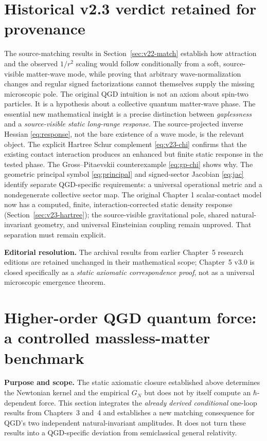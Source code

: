 \documentclass[11pt,a4paper]{article}
\theoremstyle{remark}\newtheorem{remark}[theorem]{Remark}
\begin{document}
\section{Historical v2.3 verdict retained for provenance}
The source-matching results in Section~\ref{sec:v22-match} establish how attraction and the observed $1/r^2$ scaling would follow conditionally from a soft, source-visible matter-wave mode, while proving that arbitrary wave-normalization changes and regular signed factorizations cannot themselves supply the missing microscopic pole. The original QGD intuition is not an axiom about spin-two particles. It is a hypothesis about a collective quantum matter-wave phase. The essential new mathematical insight is a precise distinction between \emph{gaplessness} and a \emph{source-visible static long-range response}. The source-projected inverse Hessian \eqref{eq:response}, not the bare existence of a wave mode, is the relevant object. The explicit Hartree Schur complement \eqref{eq:v23-chi} confirms that the existing contact interaction produces an enhanced but finite static response in the tested phase. The Gross--Pitaevskii counterexample \eqref{eq:gp-chi} shows why. The geometric principal symbol \eqref{eq:principal} and signed-sector Jacobian \eqref{eq:jac} identify separate QGD-specific requirements: a universal operational metric and a nondegenerate collective sector map. The original Chapter 1 scalar-contact model now has a computed, finite, interaction-corrected static density response (Section~\ref{sec:v23-hartree}); the source-visible gravitational pole, shared natural-invariant geometry, and universal Einsteinian coupling remain unproved. That separation must remain explicit.

\noindent\textbf{Editorial resolution.} The archival results from earlier Chapter~5 research editions are retained unchanged in their mathematical scope; Chapter~5 v3.0 is closed specifically as a \emph{static axiomatic correspondence proof}, not as a universal microscopic emergence theorem.\\[3pt]

\section{Higher-order QGD quantum force: a controlled massless-matter benchmark}\label{sec:v31-q}
\textbf{Purpose and scope.} The static axiomatic closure established above determines the
Newtonian kernel and the empirical $G_N$ but does not by itself compute an $\hbar$-dependent
force. This section integrates the \emph{already derived conditional} one-loop results from
Chapters~3 and~4 and establishes a new matching consequence for QGD's two independent
natural-invariant amplitudes. It does not turn these results into a QGD-specific deviation
from semiclassical general relativity.
\end{document}
